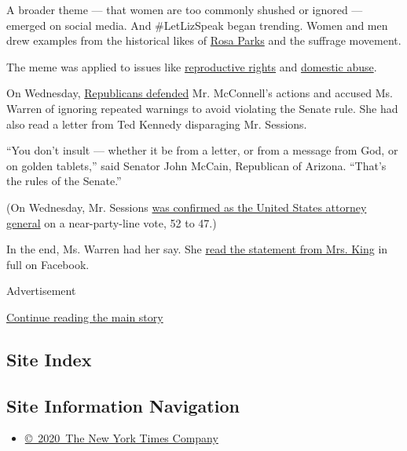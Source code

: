 A broader theme --- that women are too commonly shushed or ignored ---
emerged on social media. And \#LetLizSpeak began trending. Women and men
drew examples from the historical likes of
\href{https://twitter.com/MikeMcFeelyWDAY/status/829328899947495425}{Rosa
Parks} and the suffrage movement.

The meme was applied to issues like
\href{https://twitter.com/dawnlaguens/status/829362941430530048}{reproductive
rights} and
\href{https://twitter.com/marwilliamson/status/829290274140672000}{domestic
abuse}.

On Wednesday,
\href{https://www.nytimes.com/2017/02/08/us/politics/elizabeth-warren-coretta-scott-king.html}{Republicans
defended} Mr. McConnell's actions and accused Ms. Warren of ignoring
repeated warnings to avoid violating the Senate rule. She had also read
a letter from Ted Kennedy disparaging Mr. Sessions.

``You don't insult --- whether it be from a letter, or from a message
from God, or on golden tablets,'' said Senator John McCain, Republican
of Arizona. ``That's the rules of the Senate.''

(On Wednesday, Mr. Sessions
\href{https://www.nytimes.com/2017/02/08/us/politics/jeff-sessions-attorney-general-confirmation.html}{was
confirmed as the United States attorney general} on a near-party-line
vote, 52 to 47.)

In the end, Ms. Warren had her say. She
\href{https://www.nytimes.com/2017/02/07/us/politics/republican-senators-vote-to-formally-silence-elizabeth-warren.html?hp\&action=click\&pgtype=Homepage\&clickSource=story-heading\&module=a-lede-package-region\&region=top-news\&WT.nav=top-news}{read
the statement from Mrs. King} in full on Facebook.

Advertisement

\protect\hyperlink{after-bottom}{Continue reading the main story}

\hypertarget{site-index}{%
\subsection{Site Index}\label{site-index}}

\hypertarget{site-information-navigation}{%
\subsection{Site Information
Navigation}\label{site-information-navigation}}

\begin{itemize}
\tightlist
\item
  \href{https://help.nytimes.com/hc/en-us/articles/115014792127-Copyright-notice}{©~2020~The
  New York Times Company}
\end{itemize}

